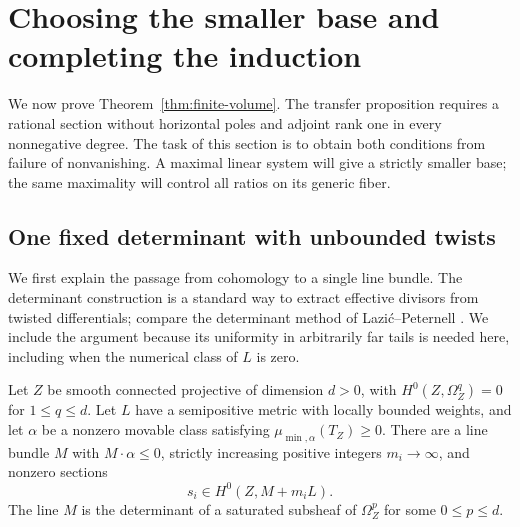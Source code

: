 \section{Choosing the smaller base and completing the induction}
\label{sec:induction}

We now prove Theorem~\ref{thm:finite-volume}. The transfer proposition
requires a rational section without horizontal poles and adjoint rank
one in every nonnegative degree. The task of this section is to obtain
both conditions from failure of nonvanishing. A maximal linear system
will give a strictly smaller base; the same maximality will control all
ratios on its generic fiber.

\subsection{One fixed determinant with unbounded twists}

We first explain the passage from cohomology to a single line bundle.
The determinant construction is a standard way to extract effective
divisors from twisted differentials; compare the determinant method of
Lazi\'c--Peternell \cite[Lemma~4.1]{LP2018}. We include the
argument because its uniformity in arbitrarily far tails is needed
here, including when the numerical class of $L$ is zero.

\begin{lemma}\label{lem:determinant}
Let $Z$ be smooth connected projective of dimension $d>0$, with
$H^0(Z,\Omega_Z^q)=0$ for $1\le q\le d$. Let $L$ have a
semipositive metric with locally bounded weights, and let $\alpha$ be
a nonzero movable class satisfying $\mu_{\min,\alpha}(T_Z)\ge0$.
There are a line bundle $M$ with $M\cdot\alpha\le0$, strictly
increasing positive integers $m_i\to\infty$, and nonzero sections
\[
                     s_i\in H^0(Z,M+m_iL).
\]
The line $M$ is the determinant of a saturated subsheaf of
$\Omega_Z^p$ for some $0\le p\le d$.
\end{lemma}

